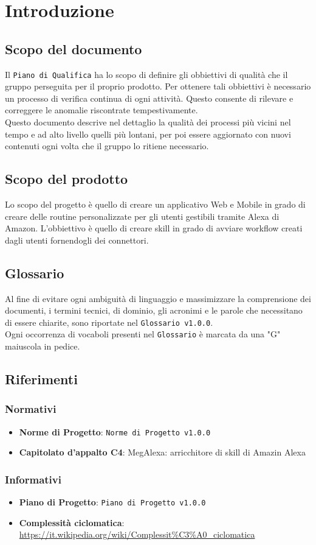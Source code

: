 \chapter{Introduzione}
\section{Scopo del documento}
Il \texttt{Piano di Qualifica} ha lo scopo di definire gli obbiettivi di qualità che il gruppo perseguita per il proprio prodotto. Per ottenere tali obbiettivi è necessario un processo di verifica continua di ogni attività. Questo consente di rilevare e correggere le anomalie riscontrate tempestivamente.\\
Questo documento descrive nel dettaglio la qualità dei processi più vicini nel tempo e ad alto livello quelli più lontani, per poi essere aggiornato con nuovi contenuti ogni volta che il gruppo lo ritiene necessario.
\section{Scopo del prodotto}
Lo scopo del progetto è quello di creare un applicativo Web e Mobile in grado di creare delle routine personalizzate per gli utenti gestibili tramite Alexa di Amazon. L'obbiettivo è quello di creare skill in grado di avviare workflow creati dagli utenti fornendogli dei connettori.
\section{Glossario}
Al fine di evitare ogni ambiguità di linguaggio e massimizzare la comprensione dei documenti, i termini tecnici, di dominio, gli acronimi e le parole che necessitano di essere chiarite, sono riportate nel \texttt{Glossario v1.0.0}.\\
Ogni occorrenza di vocaboli presenti nel \texttt{Glossario} è marcata da una "G" maiuscola in pedice.
\section{Riferimenti}
\subsection{Normativi}
\begin{itemize}
	\item  \textbf{Norme di Progetto}: \texttt{Norme di Progetto v1.0.0}
	\item \textbf{Capitolato d'appalto C4}: MegAlexa: arricchitore di skill di Amazin Alexa
\end{itemize}
\subsection{Informativi}
\begin{itemize}
	\item \textbf{Piano di Progetto}: \texttt{Piano di Progetto v1.0.0}
	\item \textbf{Complessità ciclomatica}: \url{https://it.wikipedia.org/wiki/Complessit\%C3\%A0_ciclomatica}
\end{itemize}
